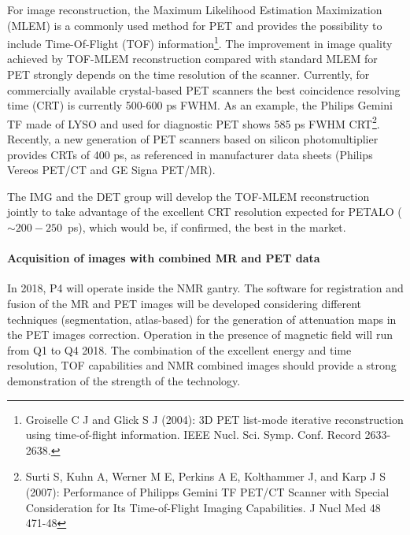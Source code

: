 For image reconstruction, the Maximum Likelihood Estimation Maximization
(MLEM) is a commonly used method for PET and provides the possibility to include
Time-Of-Flight (TOF) information\footnote{Groiselle C J and Glick S J (2004): 3D PET list-mode iterative reconstruction using time-of-flight
information. IEEE Nucl. Sci. Symp. Conf. Record 2633-2638.}. The improvement in image quality achieved by TOF-MLEM reconstruction compared with standard MLEM for PET strongly depends
on the time resolution of the scanner. Currently, for commercially available crystal-based PET scanners the best coincidence resolving time (CRT) is currently   500-600 ps FWHM. As an example, the Philips Gemini TF made of LYSO and used for diagnostic PET shows 585 ps FWHM CRT\footnote{Surti S, Kuhn A, Werner M E, Perkins A E, Kolthammer J, and Karp J S (2007): Performance of
Philipps Gemini TF PET/CT Scanner with Special Consideration for Its Time-of-Flight Imaging
Capabilities. J Nucl Med 48 471-48}.
Recently, a new generation of PET scanners based on silicon photomultiplier provides
CRTs of 400 ps, as referenced in manufacturer data sheets (Philips Vereos PET/CT and
GE Signa PET/MR).

The IMG and the DET group will develop the TOF-MLEM reconstruction jointly to take advantage of the excellent CRT resolution expected for PETALO ($\sim 200-250$~ps), which would be, if confirmed, the best in the market. 

\paragraph{Acquisition of images with combined MR and PET data}
In 2018, P4 will operate inside the NMR gantry. 
The software for registration and fusion of the MR and PET images will be developed considering different techniques (segmentation, atlas-based) for the generation of attenuation maps in the PET images correction. Operation in the presence of magnetic field will run from Q1 to Q4 2018. The combination of the excellent energy and time resolution, TOF capabilities and NMR combined images should provide a strong demonstration of the strength of the technology. 

